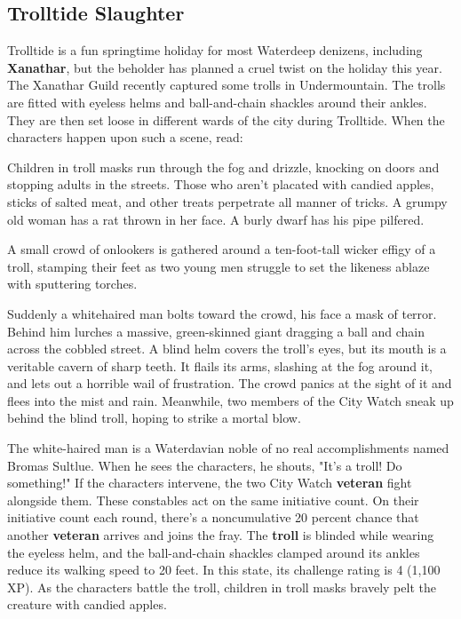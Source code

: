\documentclass[10pt,a4paper,twoside,twocolumn,openany,nodeprecatedcode]{dndbook}
\begin{document}
\subsection{Trolltide Slaughter}
Trolltide is a fun springtime holiday for most Waterdeep denizens, including \textbf{Xanathar}, but the beholder has planned a cruel twist on the holiday this year.
The Xanathar Guild recently captured some trolls in Undermountain. The trolls are fitted with eyeless helms and ball-and-chain shackles around their ankles. They are then set loose in different wards of the city during Trolltide. When the characters happen upon such a scene, read:
\begin{DndReadAloud}{}
Children in troll masks run through the fog and drizzle, knocking on doors and stopping adults in the streets. Those who aren't placated with candied apples, sticks of salted meat, and other treats perpetrate all manner of tricks. A grumpy old woman has a rat thrown in her face. A burly dwarf has his pipe pilfered.

A small crowd of onlookers is gathered around a ten-foot-tall wicker effigy of a troll, stamping their feet as two young men struggle to set the likeness ablaze with sputtering torches.

Suddenly a whitehaired man bolts toward the crowd, his face a mask of terror. Behind him lurches a massive, green-skinned giant dragging a ball and chain across the cobbled street. A blind helm covers the troll's eyes, but its mouth is a veritable cavern of sharp teeth. It flails its arms, slashing at the fog around it, and lets out a horrible wail of frustration. The crowd panics at the sight of it and flees into the mist and rain. Meanwhile, two members of the City Watch sneak up behind the blind troll, hoping to strike a mortal blow.
\end{DndReadAloud}

The white-haired man is a Waterdavian noble of no real accomplishments named Bromas Sultlue. When he sees the characters, he shouts, "It's a troll! Do something!" If the characters intervene, the two City Watch \textbf{veteran} fight alongside them. These constables act on the same initiative count. On their initiative count each round, there's a noncumulative 20 percent chance that another \textbf{veteran} arrives and joins the fray.
The \textbf{troll} is blinded while wearing the eyeless helm, and the ball-and-chain shackles clamped around its ankles reduce its walking speed to 20 feet. In this state, its challenge rating is 4 (1,100 XP). As the characters battle the troll, children in troll masks bravely pelt the creature with candied apples.
\end{document}

